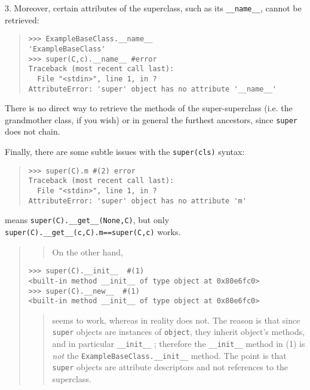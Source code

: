 \documentclass[10pt,english]{article}
\begin{document}
3. Moreover, certain attributes of the superclass, such as its
\texttt{{\_}{\_}name{\_}{\_}}, cannot be retrieved:
\begin{quote}
\begin{verbatim}>>> ExampleBaseClass.__name__
'ExampleBaseClass'
>>> super(C,c).__name__ #error
Traceback (most recent call last):
  File "<stdin>", line 1, in ?
AttributeError: 'super' object has no attribute '__name__'\end{verbatim}
\end{quote}
\begin{list}{.}
{
\addtocounter{listcnt25}{3}
\setlength{\rightmargin}{\leftmargin}
}
\item {} 
There is no direct way to retrieve the methods of the super-superclass 
(i.e. the grandmother class, if you wish) or in general the furthest 
ancestors, since \texttt{super} does not chain.

\item {} 
Finally, there are some subtle issues with the \texttt{super(cls)} syntax:

\end{list}
\begin{quote}
\begin{verbatim}>>> super(C).m #(2) error
Traceback (most recent call last):
  File "<stdin>", line 1, in ?
AttributeError: 'super' object has no attribute 'm'\end{verbatim}
\end{quote}

means \texttt{super(C).{\_}{\_}get{\_}{\_}(None,C)}, but only 
\texttt{super(C).{\_}{\_}get{\_}{\_}(c,C).m==super(C,c)} works.
\begin{quote}
\begin{quote}

On the other hand,
\end{quote}
\begin{verbatim}>>> super(C).__init__  #(1) 
<built-in method __init__ of type object at 0x80e6fc0>
>>> super(C).__new__  #(1) 
<built-in method __init__ of type object at 0x80e6fc0>\end{verbatim}
\begin{quote}

seems to work, whereas in reality does not. The reason is that since 
\texttt{super} objects are instances 
of \texttt{object}, they inherit object's methods, and in particular 
\texttt{{\_}{\_}init{\_}{\_}} ; therefore the \texttt{{\_}{\_}init{\_}{\_}} method in (1) is \emph{not} 
the \texttt{ExampleBaseClass.{\_}{\_}init{\_}{\_}} method. The point is that \texttt{super} 
objects are attribute descriptors and not references to the superclass.
\end{quote}
\end{quote}
\end{document}
